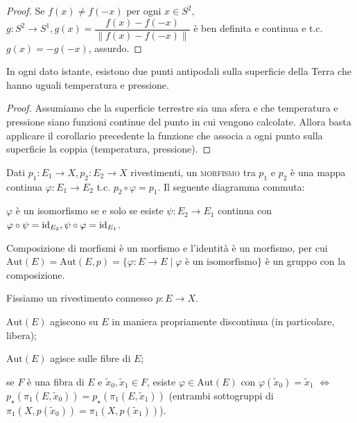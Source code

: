 \begin{proof}
  Se $f(x) \not=f(-x)$ per ogni $x \in S^2$, $g:S^2 \rightarrow S^1, g(x)=\dfrac{f(x)-f(-x)}{\|f(x)-f(-x)\|}$ è ben definita e continua e t.c. $g(x)=-g(-x)$, assurdo.
\end{proof}

\begin{cor}
  In ogni dato istante, esistono due punti antipodali sulla superficie della Terra che hanno uguali temperatura e pressione.
\end{cor}

\begin{proof}
  Assumiamo che la superficie terrestre sia una sfera e che temperatura e pressione siano funzioni continue del punto in cui vengono calcolate. Allora basta applicare il corollario precedente la funzione che associa a ogni punto sulla superficie la coppia (temperatura, pressione).
\end{proof}

\begin{defn}
  Dati $p_1:E_1 \rightarrow X, p_2:E_2 \rightarrow X$ rivestimenti, un \textsc{morfismo} tra $p_1$ e $p_2$ è una mappa continua $\varphi:E_1 \rightarrow E_2$ t.c. $p_2 \circ \varphi=p_1$. Il seguente diagramma commuta:
  \begin{center}
  \end{center}
  $\varphi$ è un isomorfismo se e solo se esiste $\psi:E_2 \rightarrow E_1$ continua con $\varphi \circ \psi=\operatorname{id}_{E_2}, \psi \circ \varphi=\operatorname{id}_{E_1}$.
\end{defn}

Composizione di morfismi è un morfismo e l'identità è un morfismo, per cui $\text{Aut}(E)=\text{Aut}(E, p)=\{\varphi:E \rightarrow E \mid \varphi \text{ è un isomorfismo}\}$ è un gruppo con la composizione.

Fissiamo un rivestimento connesso $p:E \rightarrow X$.

\begin{thm}
  \begin{nlist}
    \item $\text{Aut}(E)$ agiscono su $E$ in maniera propriamente discontinua (in particolare, libera);
    \item $\text{Aut}(E)$ agisce sulle fibre di $E$;
    \item se $F$ è una fibra di $E$ e $\tilde{x}_0, \tilde{x}_1 \in F$, esiste $\varphi \in \text{Aut}(E)$ con $\varphi(\tilde{x}_0)=\tilde{x}_1$ $\iff$ $p_{\star}(\pi_1(E, \tilde{x}_0))=p_{\star}(\pi_1(E, \tilde{x}_1))$
    (entrambi sottogruppi di $\pi_1(X, p(\tilde{x}_0))=\pi_1(X, p(\tilde{x}_1))$).
  \end{nlist}
\end{thm}

